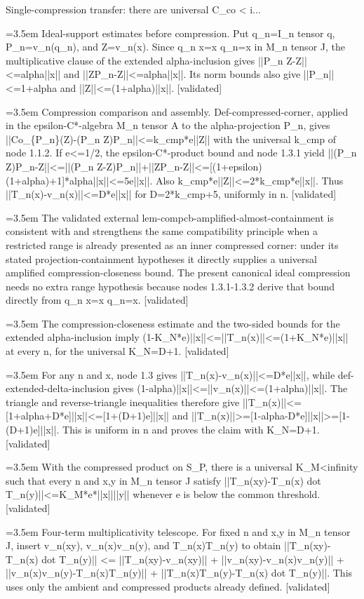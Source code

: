 \documentclass{article}
\newcommand{\step}[1]{\par\noindent\hangindent=3.5em\hangafter=1%
  \makebox[3.5em][l]{\textbf{#1.}}}
\newcommand{\steptag}[1]{\hfill{\small\textsf{[#1]}}}
\begin{document}
\begin{proofbox}{Single-compression transfer: there are universal C\_co < i...}
\step{1.3.1} Ideal-support estimates before compression. Put q\_n=I\_n tensor q, P\_n=v\_n(q\_n), and Z=v\_n(x). Since q\_n x=x q\_n=x in M\_n tensor J, the multiplicative clause of the extended alpha-inclusion gives ||P\_n Z-Z||<=alpha||x|| and ||ZP\_n-Z||<=alpha||x||. Its norm bounds also give ||P\_n||<=1+alpha and ||Z||<=(1+alpha)||x||. \steptag{validated} \\[4pt]
\step{1.3.2} Compression comparison and assembly. Def-compressed-corner, applied in the epsilon-C*-algebra M\_n tensor A to the alpha-projection P\_n, gives ||Co\_\{P\_n\}(Z)-(P\_n Z)P\_n||<=k\_cmp*e||Z|| with the universal k\_cmp of node 1.1.2. If e<=1/2, the epsilon-C*-product bound and node 1.3.1 yield ||(P\_n Z)P\_n-Z||<=||(P\_n Z-Z)P\_n||+||ZP\_n-Z||<=[(1+epsilon)(1+alpha)+1]*alpha||x||<=5e||x||. Also k\_cmp*e||Z||<=2*k\_cmp*e||x||. Thus ||T\_n(x)-v\_n(x)||<=D*e||x|| for D=2*k\_cmp+5, uniformly in n. \steptag{validated} \\[4pt]
\step{1.3.3} The validated external lem-compcb-amplified-almost-containment is consistent with and strengthens the same compatibility principle when a restricted range is already presented as an inner compressed corner: under its stated projection-containment hypotheses it directly supplies a universal amplified compression-closeness bound. The present canonical ideal compression needs no extra range hypothesis because nodes 1.3.1-1.3.2 derive that bound directly from q\_n x=x q\_n=x. \steptag{validated} \\[4pt]
\step{1.4} The compression-closeness estimate and the two-sided bounds for the extended alpha-inclusion imply (1-K\_N*e)||x||<=||T\_n(x)||<=(1+K\_N*e)||x|| at every n, for the universal K\_N=D+1. \steptag{validated} \\[6pt]
\step{1.4.1} For any n and x, node 1.3 gives ||T\_n(x)-v\_n(x)||<=D*e||x||, while def-extended-delta-inclusion gives (1-alpha)||x||<=||v\_n(x)||<=(1+alpha)||x||. The triangle and reverse-triangle inequalities therefore give ||T\_n(x)||<=[1+alpha+D*e]||x||<=[1+(D+1)e]||x|| and ||T\_n(x)||>=[1-alpha-D*e]||x||>=[1-(D+1)e]||x||. This is uniform in n and proves the claim with K\_N=D+1. \steptag{validated} \\[4pt]
\step{1.5} With the compressed product on S\_P, there is a universal K\_M<infinity such that every n and x,y in M\_n tensor J satisfy ||T\_n(xy)-T\_n(x) dot T\_n(y)||<=K\_M*e*||x||||y|| whenever e is below the common threshold. \steptag{validated} \\[6pt]
\step{1.5.1} Four-term multiplicativity telescope. For fixed n and x,y in M\_n tensor J, insert v\_n(xy), v\_n(x)v\_n(y), and T\_n(x)T\_n(y) to obtain ||T\_n(xy)-T\_n(x) dot T\_n(y)|| <= ||T\_n(xy)-v\_n(xy)|| + ||v\_n(xy)-v\_n(x)v\_n(y)|| + ||v\_n(x)v\_n(y)-T\_n(x)T\_n(y)|| + ||T\_n(x)T\_n(y)-T\_n(x) dot T\_n(y)||. This uses only the ambient and compressed products already defined. \steptag{validated} \\[4pt]

\end{proofbox}
\end{document}
